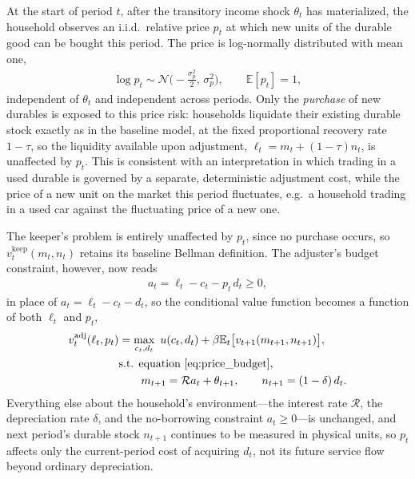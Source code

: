 At the start of period $t$, after the transitory income shock $\theta_t$ has materialized, the household observes an i.i.d.\ relative price $p_t$ at which new units of the durable good can be bought this period. The price is log-normally distributed with mean one,
\begin{align}
	\log p_t \sim \mathcal{N}\Big(-\frac{\sigma_p^2}{2},\, \sigma_p^2\Big), \qquad \mathbb{E}[p_t] = 1, \label{eq:price_dist}
\end{align}
independent of $\theta_t$ and independent across periods. Only the \emph{purchase} of new durables is exposed to this price risk: households liquidate their existing durable stock exactly as in the baseline model, at the fixed proportional recovery rate $1-\tau$, so the liquidity available upon adjustment, $\ell_t = m_t + (1-\tau)n_t$, is unaffected by $p_t$. This is consistent with an interpretation in which trading in a used durable is governed by a separate, deterministic adjustment cost, while the price of a new unit on the market this period fluctuates, e.g.\ a household trading in a used car against the fluctuating price of a new one.

The keeper's problem is entirely unaffected by $p_t$, since no purchase occurs, so $v_t^{\text{keep}}(m_t,n_t)$ retains its baseline Bellman definition. The adjuster's budget constraint, however, now reads
\begin{align}
	a_t = \ell_t - c_t - p_t\, d_t \ge 0, \label{eq:price_budget}
\end{align}
in place of $a_t=\ell_t-c_t-d_t$, so the conditional value function becomes a function of both $\ell_t$ and $p_t$,
\begin{align}
	v_t^{\text{adj}}(\ell_t,p_t) &= \max_{c_t,d_t} \ u(c_t,d_t) + \beta \mathbb{E}_t \big[ v_{t+1}(m_{t+1},n_{t+1}) \big],\\
	& \text{s.t. equation~\eqref{eq:price_budget},}\\
	& \qquad m_{t+1} = \mathcal{R} a_t + \theta_{t+1}, \qquad n_{t+1} = (1-\delta)\,d_t.
\end{align}
Everything else about the household's environment---the interest rate $\mathcal{R}$, the depreciation rate $\delta$, and the no-borrowing constraint $a_t \ge 0$---is unchanged, and next period's durable stock $n_{t+1}$ continues to be measured in physical units, so $p_t$ affects only the current-period cost of acquiring $d_t$, not its future service flow beyond ordinary depreciation.

